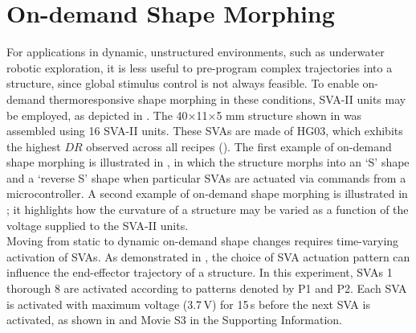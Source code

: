 \section{On-demand Shape Morphing}
For applications in dynamic, unstructured environments, such as underwater robotic exploration, it is less useful to pre-program complex trajectories into a structure, since global stimulus control is not always feasible. To enable on-demand thermoresponsive shape morphing in these conditions, SVA-II units may be employed, as depicted in . The 40×11×5 mm structure shown in  was assembled using 16 SVA-II units. These SVAs are made of HG03, which exhibits the highest $DR$ observed across all recipes (). The first example of on-demand shape morphing is illustrated in , in which the structure morphs into an `S' shape and a `reverse S' shape when particular SVAs are actuated via commands from a microcontroller. %
A second example of on-demand shape morphing is illustrated in ; it highlights how the curvature of a structure may be varied as a function of the voltage supplied to the SVA-II units.\\

Moving from static to dynamic on-demand shape changes requires time-varying activation of SVAs.
As demonstrated in , the choice of SVA actuation pattern can influence the end-effector trajectory of a structure. In this experiment, SVAs 1 thorough 8 are activated according to patterns denoted by P1 and P2.
Each SVA is activated with maximum voltage (3.7\,V) for 15\,s before the next SVA is activated, as shown in  
and Movie S3 in the Supporting Information.\\  



